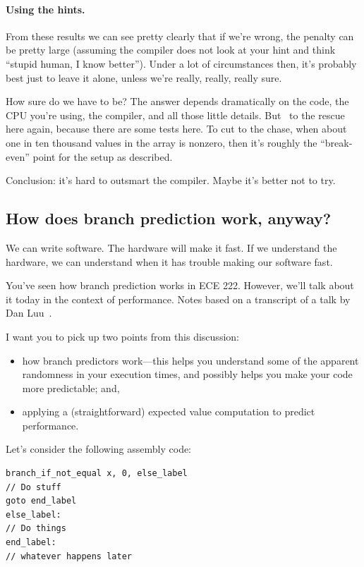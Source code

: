 \documentclass[a4paper]{report}
\begin{document}
\paragraph{Using the hints.} From these results we can see pretty clearly that if we're wrong, the penalty can be pretty large (assuming the compiler does not look at your hint and think ``stupid human, I know better''). Under a lot of circumstances then, it's probably best just to leave it alone, unless we're really, really, really sure. 

How sure do we have to be? The answer depends dramatically on the code, the CPU you're using, the compiler, and all those little details. But~\cite{mispredict} to the rescue here again, because there are some tests here. To cut to the chase, when about one in ten thousand values in the array is nonzero, then it's roughly the ``break-even'' point for the setup as described.

Conclusion: it's hard to outsmart the compiler. Maybe it's better not to try.

\subsection*{How does branch prediction work, anyway?}
We can write software. The hardware will make it fast. If we understand the hardware, we can understand when it has trouble making our software fast.

You've seen how branch prediction works in ECE 222. However, we'll talk about it today in the context of performance. Notes based on a transcript of a talk by Dan Luu~\cite{branchprediction}.

I want you to pick up two points from this discussion:
\vspace*{-1em}
\begin{itemize}[noitemsep]
\item how branch predictors work---this helps you understand some of the apparent randomness in your
execution times, and possibly helps you make your code more predictable; and,
\item applying a (straightforward) expected value computation to predict performance.
\end{itemize}

Let's consider the following assembly code:

\hspace*{2em} \begin{minipage}{.4\textwidth} \begin{lstlisting}
branch_if_not_equal x, 0, else_label
// Do stuff
goto end_label
else_label:
// Do things
end_label:
// whatever happens later
\end{lstlisting}
\end{minipage}
\end{document}
